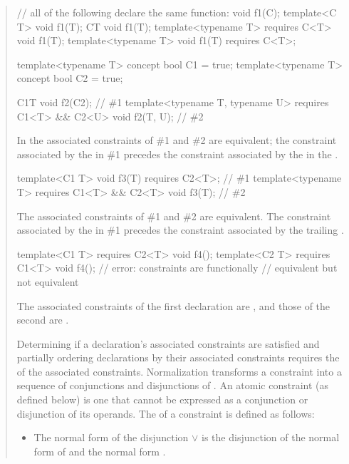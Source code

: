\begin{quote}
\begin{codeblock}
// all of the following declare the same function:
void f1(C);
template<C T> void f1(T);
C{T} void f1(T);
template<typename T> requires C<T> void f1(T);
template<typename T> void f1(T) requires C<T>;
\end{codeblock}
\exitexample
% 
\enterexample
\begin{codeblock}
template<typename T> concept bool C1 = true;
template<typename T> concept bool C2 = true;

C1{T} void f2(C2);                                                      // \#1
template<typename T, typename U> requires C1<T> && C2<U> void f2(T, U); // \#2
\end{codeblock}
% 
In the associated constraints of \#1 and \#2 are equivalent; the constraint
associated by the  in \#1 precedes the
constraint associated by the  in
the .
% 
\begin{codeblock}
template<C1 T> void f3(T) requires C2<T>;                // \#1
template<typename T> requires C1<T> && C2<T> void f3(T); // \#2
\end{codeblock}
The associated constraints of \#1 and \#2 are equivalent. The constraint
associated by the  in \#1 precedes the 
constraint associated by the trailing .
% 
\begin{codeblock}
template<C1 T> requires C2<T> void f4();
template<C2 T> requires C1<T> void f4(); // error: constraints are functionally
                                         // equivalent but not equivalent
\end{codeblock}
% 
The associated constraints of the first declaration are
, and those of the second are
.
\exitexample

\pnum
Determining if a declaration's associated constraints are satisfied
and partially ordering declarations by their associated constraints
requires the  of the associated constraints. 
% 
Normalization transforms a constraint into a
sequence of conjunctions and disjunctions of .
% 
An atomic constraint (as defined below) is one that cannot be expressed
as a conjunction or disjunction of its operands.
% 
The  of a constraint is defined as follows:
% 
\begin{itemize}
\item The normal form of the disjunction  $\lor$  is the 
disjunction of the normal form of  and the normal form .


\end{itemize}
\end{quote}
